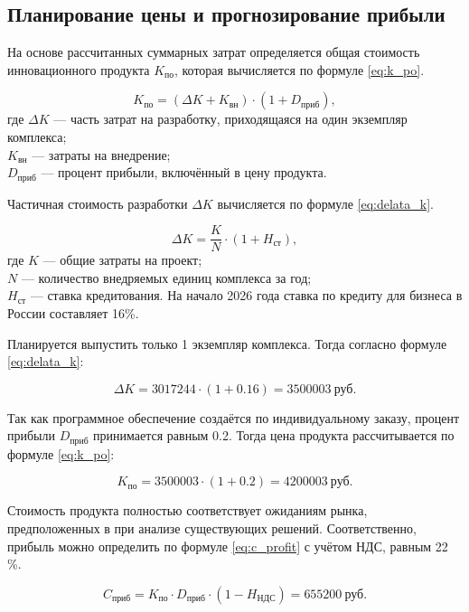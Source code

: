 \subsection{Планирование цены и прогнозирование прибыли}

На основе рассчитанных суммарных затрат определяется общая стоимость инновационного продукта $K_{\text{по}}$, которая вычисляется по формуле \ref{eq:k_po}.

\begin{equation}\label{eq:k_po}
  K_{\text{по}} = (\Delta K + K_{\text{вн}})\cdot (1 + D_{\text{приб}}),
\end{equation}
где $\Delta K$ — часть затрат на разработку, приходящаяся на один экземпляр комплекса; \\ $K_{\text{вн}}$ — затраты на внедрение; \\ $D_{\text{приб}}$ — процент прибыли, включённый в цену продукта.  

Частичная стоимость разработки $\Delta K$ вычисляется по формуле \ref{eq:delata_k}.

\begin{equation}\label{eq:delata_k}
  \Delta K = \frac{K}{N}\cdot (1 + H_{\text{ст}}),
\end{equation}
где $K$ — общие затраты на проект; \\ $N$ — количество внедряемых единиц комплекса за год;  \\ $H_{\text{ст}}$ — ставка кредитования. На начало 2026 года ставка по кредиту для бизнеса в России составляет 16\%. 

Планируется выпустить только 1 экземпляр комплекса. Тогда согласно формуле \ref{eq:delata_k}:

$$
  \Delta K = 3017244 \cdot (1 + 0.16) = 3500003 \ \text{руб.}
$$

Так как программное обеспечение создаётся по индивидуальному заказу, процент прибыли $D_{\text{приб}}$ принимается равным 0.2. Тогда цена продукта рассчитывается по формуле \ref{eq:k_po}:

$$
  K_{\text{по}} = 3500003 \cdot (1 + 0.2) = 4200003 \ \text{руб.}
$$

Стоимость продукта полностью соответствует ожиданиям рынка, предположенных в при анализе существующих решений. Соответственно, прибыль можно определить по формуле \ref{eq:c_profit} с учётом НДС, равным 22 \%.

\nopagebreak
\begin{equation}\label{eq:c_profit}
  C_{\text{приб}} = K_{\text{по}} \cdot D_{\text{приб}} \cdot (1 - H_{\text{НДС}}) = 655200 \ \text{руб.}
\end{equation}
